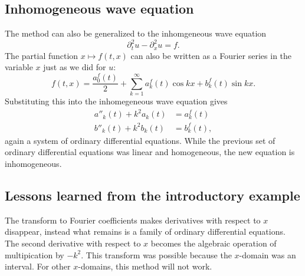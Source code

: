 \subsection{Inhomogeneous wave equation}
The method can also be generalized to the inhomgeneous wave equation
\[
\partial_t^2u-\partial_x^2u=f.
\]
The partial function $x\mapsto f(t,x)$ can also be written 
as a Fourier series in the variable $x$ just as we did for $u$:
\[
f(t,x)=\frac{a_0^f(t)}2+\sum_{k=1}^\infty a_k^f(t)\cos kx+b_k^f(t)\sin kx.
\]
Substituting this into the inhomegeneous wave equation gives
\begin{align*}
a''_k(t)+k^2a_k(t)&=a_k^f(t)\\
b''_k(t)+k^2b_k(t)&=b_k^f(t),
\end{align*}
again a system of ordinary differential equations.
While the previous set of ordinary differential equations was linear
and homogeneous, the new equation is inhomogeneous.

\subsection{Lessons learned from the introductory example}
The transform to Fourier coefficients makes derivatives with respect
to $x$ disappear, instead what remains is a family of ordinary
differential equations.
The second derivative with respect to $x$ becomes the algebraic
operation of multipication by $-k^2$.
This transform was possible because the $x$-domain was an interval.
For other $x$-domains, this method will not work.

